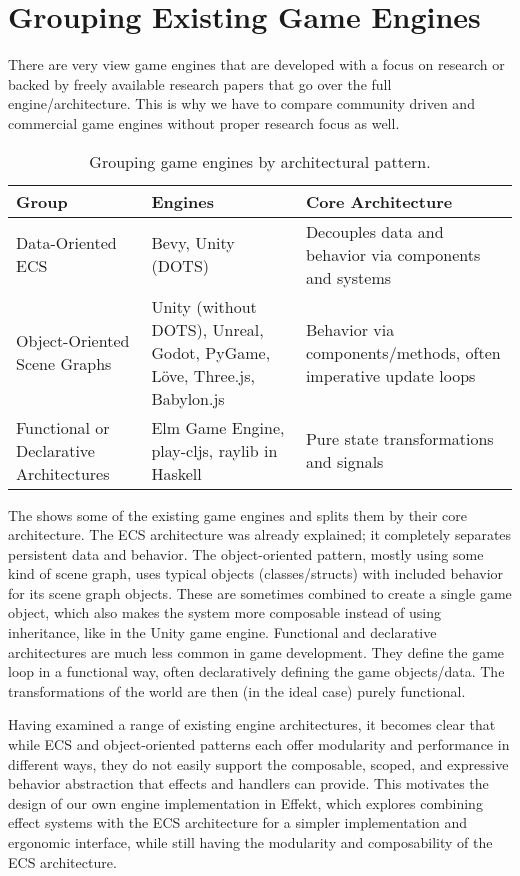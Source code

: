 \section{Grouping Existing Game Engines}

There are very view game engines that are developed with a focus on research or backed by freely available research papers that go over the full engine/architecture. This is why we have to compare community driven and commercial game engines without proper research focus as well.

\begin{table}[h!]
\centering
\begin{tabular}{p{4cm}p{4cm}p{4cm}}
\hline
\textbf{Group} & \textbf{Engines} & \textbf{Core Architecture} \\
\hline
Data-Oriented ECS &
Bevy, Unity (DOTS) &
Decouples data and behavior via components and systems \\
\hline
Object-Oriented Scene Graphs &
Unity (without DOTS), Unreal, Godot, PyGame, Löve, Three.js, Babylon.js &
Behavior via components/methods, often imperative update loops \\
\hline
Functional or Declarative Architectures &
Elm Game Engine, play-cljs, raylib in Haskell &
Pure state transformations and signals \\
\hline
\end{tabular}
\caption{Grouping game engines by architectural pattern.}
\label{tab:grouping}
\end{table}

The  shows some of the existing game engines and splits them by their core architecture. The ECS architecture was already explained; it completely separates persistent data and behavior. The object-oriented pattern, mostly using some kind of scene graph, uses typical objects (classes/structs) with included behavior for its scene graph objects. These are sometimes combined to create a single game object, which also makes the system more composable instead of using inheritance, like in the Unity game engine. Functional and declarative architectures are much less common in game development. They define the game loop in a functional way, often declaratively defining the game objects/data. The transformations of the world are then (in the ideal case) purely functional.

Having examined a range of existing engine architectures, it becomes clear that while ECS and object-oriented patterns each offer modularity and performance in different ways, they do not easily support the composable, scoped, and expressive behavior abstraction that effects and handlers can provide. This motivates the design of our own engine implementation in Effekt, which explores combining effect systems with the ECS architecture for a simpler implementation and ergonomic interface, while still having the modularity and composability of the ECS architecture.
